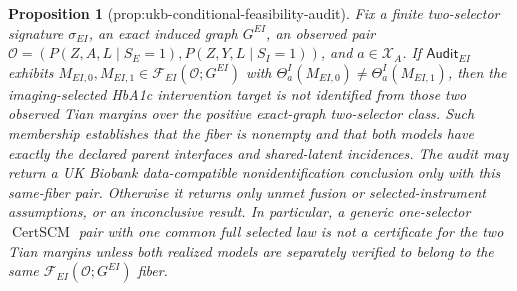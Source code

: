 \documentclass{article}
\newtheorem{proposition}{Proposition}
\begin{document}
\begin{proposition}[prop:ukb-conditional-feasibility-audit]\label{prop:ukb-conditional-feasibility-audit}
Fix a finite two-selector signature \(\sigma_{EI}\), an exact induced graph \(G^{EI}\), an observed pair \(\mathcal O=(P(Z,A,L\mid S_E=1),P(Z,Y,L\mid S_I=1))\), and \(a\in\mathcal X_A\). If \(\mathsf{Audit}_{EI}\) exhibits \(M_{EI,0},M_{EI,1}\in\mathcal F_{EI}(\mathcal O;G^{EI})\) with \(\Theta^I_a(M_{EI,0})\ne\Theta^I_a(M_{EI,1})\), then the imaging-selected HbA1c intervention target is not identified from those two observed Tian margins over the positive exact-graph two-selector class. Such membership establishes that the fiber is nonempty and that both models have exactly the declared parent interfaces and shared-latent incidences. The audit may return a UK Biobank data-compatible nonidentification conclusion only with this same-fiber pair. Otherwise it returns only unmet fusion or selected-instrument assumptions, or an inconclusive result. In particular, a generic one-selector \(\operatorname{CertSCM}\) pair with one common full selected law is not a certificate for the two Tian margins unless both realized models are separately verified to belong to the same \(\mathcal F_{EI}(\mathcal O;G^{EI})\) fiber.
\end{proposition}
\end{document}
